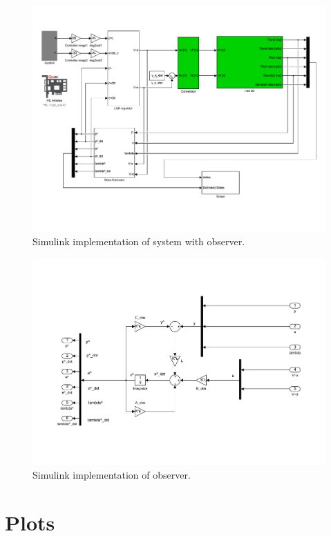 \begin{figure}[!htb]
	\centering
	\includegraphics[trim=0 100 0 50, clip, width=\textwidth]{simulink/P4p2.pdf}
	\caption{Simulink implementation of system with observer.}
\label{fig:ObserverSystem}
\end{figure}

\begin{figure}[!htb]
	\centering
	\includegraphics[trim=0 100 0 100, clip, width=\textwidth]{simulink/P4p2_state_estimator.pdf}
	\caption{Simulink implementation of observer.}
\label{fig:Observer}
\end{figure}

\clearpage
\section{Plots}

